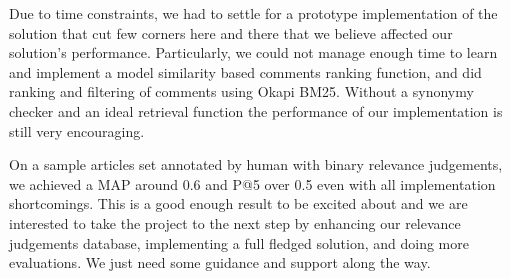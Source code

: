 \documentclass[article]{IEEEtran}
\begin{document}
Due to time constraints, we had to settle for a prototype implementation of the solution that cut few corners here and there that we believe affected our solution's performance. Particularly, we could not manage enough time to learn and implement a model similarity based comments ranking function, and did ranking and filtering of comments using Okapi BM25. Without a synonymy checker and an ideal retrieval function the performance of our implementation is still very encouraging.

On a sample articles set annotated by human with binary relevance judgements, we achieved a MAP around 0.6 and P@5 over 0.5         even with all implementation shortcomings. This is a good enough result to be excited about and we are interested to take the project to the next step by enhancing our relevance judgements database, implementing a full fledged solution, and doing more evaluations. We just need some guidance and support along the way. 


 
\end{document}
